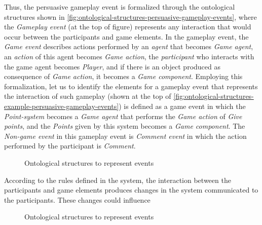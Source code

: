  Thus, the persuasive gameplay event is formalized through the ontological structures shown in \autoref{fig:ontological-structures-persuasive-gameplay-events}, where the \emph{Gameplay event} (at the top of figure) represents any interaction that would occur between the participants and game elements. In the gameplay event, the \emph{Game event} describes actions performed by an \emph{agent} that becomes \emph{Game agent}, an \emph{action} of this agent becomes \emph{Game action}, the \emph{participant} who interacts with the game agent becomes \emph{Player}, and if there is an object produced as consequence of \emph{Game action}, it becomes a \emph{Game component}. Employing this formalization, let us to identify the elements for a gameplay event that represents the interaction of  such gameplay (shown at the top of \autoref{fig:ontological-structures-example-persuasive-gameplay-events}) is defined as a game event  in which the \emph{Point-system} becomes a \emph{Game agent} that performs the \emph{Game action} of \emph{Give points}, and the \emph{Points} given by this system becomes a \emph{Game component}. The \emph{Non-game event} in this gameplay event is \emph{Comment event} in which the action performed by the participant is \emph{Comment}.

\begin{figure}[!htb]
 \caption{Ontological structures to represent events}
 \label{fig:ontological-structures-persuasive-gameplay-events}
 \centering
 \fautor
\end{figure}

According to the rules defined in the system, the interaction between the participants and game elements produces changes in the system communicated to the participants. These changes could influence 



\begin{figure}[!htb]
 \caption{Ontological structures to represent events}
 \label{fig:ontological-structures-example-persuasive-gameplay-events}
 \centering
 \fautor
\end{figure}







